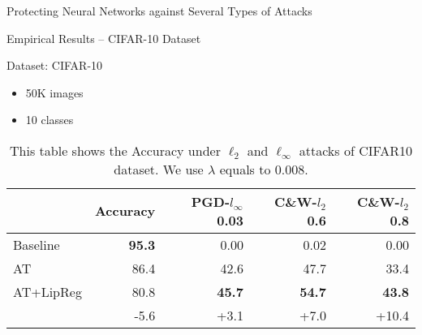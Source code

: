 \begin{frame}{Protecting Neural Networks against Several Types of Attacks}

\end{frame}




\begin{frame}{Empirical Results -- CIFAR-10 Dataset}

  \begin{block}{Dataset: CIFAR-10}
  \begin{itemize}
    \item 50K images
    \item 10 classes
  \end{itemize}
  \end{block}

  \begin{table}[t]
    \centering
      {\small
      \begin{tabular}{lrrrr}
      \toprule
      & \textbf{Accuracy} & \textbf{PGD}-$l_\infty$ 0.03 & \textbf{C\&W}-$l_2$ 0.6 & \textbf{C\&W}-$l_2$ 0.8 \\
      \midrule
      Baseline  & \textbf{95.3} & 0.00 & 0.02 & 0.00 \\
      AT        & 86.4 & 42.6 & 47.7 & 33.4 \\
      AT+LipReg & 80.8 & \textbf{45.7} & \textbf{54.7} & \textbf{43.8} \\
      \midrule
       & -5.6 & +3.1 & +7.0 & +10.4 \\
      \bottomrule
      \end{tabular}%
      }
    \caption{This table shows the Accuracy under $\ell_2$ and $\ell_\infty$ attacks of CIFAR10 dataset. We use $\lambda$ equals to $0.008$.}
  \end{table}%

\end{frame}


